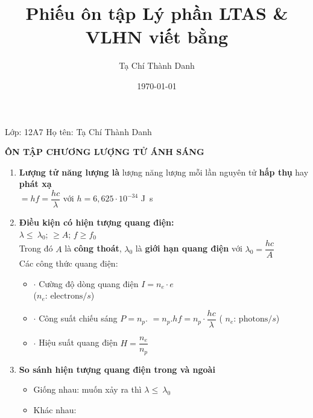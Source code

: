 \documentclass[a4paper,12pt,titlepage,twocolumn]{article}
\title{Phiếu ôn tập Lý phần LTAS \& VLHN viết bằng \textbf{\LaTeXe}}
\date{\today}
\author{Tạ Chí Thành Danh}
\newenvironment{myitemize} 
{ \begin{itemize}[leftmargin=*,label=-]  %
		\setlength{\itemsep}{0pt}
		\setlength{\parskip}{0pt}
		\setlength{\parsep}{0pt}     }
{ \end{itemize}                  }
\newenvironment{myenumerate}
{ \begin{enumerate}[label=\textbf{\arabic*}.]
\setlist{nolistsep} %
\setlength{\itemsep}{0pt}
\setlength{\parskip}{0pt}
\setlength{\parsep}{0pt}	}
{ \end{enumerate}}
\begin{document}
Lớp: 12A7 \quad Họ tên: Tạ Chí Thành Danh \\
\begin{adjustwidth}{-0.2cm}{}
	\begin{center}
		\small\textbf{ÔN TẬP CHƯƠNG LƯỢNG TỬ ÁNH SÁNG}
	\end{center}
\end{adjustwidth}
\begin{myenumerate}
	\item \textbf{Lượng tử năng lượng là} lượng năng lượng mỗi lần nguyên tử \textbf{hấp thụ} hay \textbf{phát xạ} \\
		\textepsilon{} $=hf=\dfrac{hc}{\lambda}$ với $h=6,625 \cdot 10^{-34}$ \si{\joule\second}
	\item \textbf{Điều kiện có hiện tượng quang điện:} \\
	$\lambda \leqslant\ \lambda_0$; \textepsilon{} $\geqslant A$; $f \geqslant f_0$ \\
	Trong đó $A$ là \textbf{công thoát}, $\lambda_0$ là \textbf{giới hạn quang điện} với $\lambda_0 = \dfrac{hc}{A}$ \\
	Các công thức quang điện: 
	\begin{myitemize}
	\item[$\boldsymbol{\cdot}$ ]Cường độ dòng quang điện $I = n_e \cdot e$ \\ ($n_e$: $\mathrm{electrons}/s$)
	\item[$\boldsymbol{\cdot}$ ] Công suất chiếu sáng $P=n_p.$\textepsilon{} $=n_p.hf = n_p \cdot \dfrac{hc}{\lambda}$ ( $n_e$: $\mathrm{photons}/s$)
	\item[$\boldsymbol{\cdot}$ ] Hiệu suất quang điện $H = \dfrac{n_e}{n_p}$
	\end{myitemize}
	\item \textbf{So sánh hiện tượng quang điện trong và ngoài}
	\begin{myitemize}
		\item Giống nhau: muốn xảy ra thì $\lambda \leqslant\ \lambda_0$
		\item Khác nhau:
	\end{myitemize}
	\begin{adjustwidth}{-1cm}{}
	\renewcommand{\arraystretch}{0} 
	\begin{tabular}{|p{4.3cm}|p{4.3cm}|}

\end{tabular}
\end{adjustwidth}
\end{myenumerate}
\end{document}
